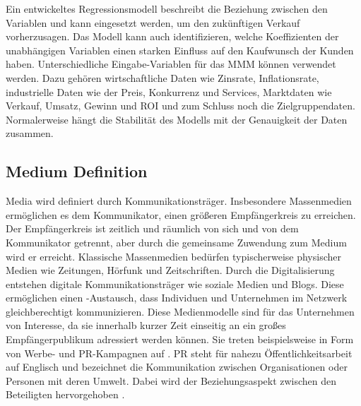 Ein entwickeltes Regressionsmodell beschreibt die Beziehung zwischen den Variablen und kann eingesetzt werden, um den zukünftigen Verkauf vorherzusagen. Das Modell kann auch identifizieren, welche Koeffizienten der unabhängigen Variablen einen starken Einfluss auf den Kaufwunsch der Kunden haben. Unterschiedliche Eingabe-Variablen für das \ac{MMM} können verwendet werden. Dazu gehören wirtschaftliche Daten wie Zinsrate, Inflationsrate, industrielle Daten wie der Preis, Konkurrenz und Services, Marktdaten wie Verkauf, Umsatz, Gewinn und \ac{ROI} und zum Schluss noch die Zielgruppendaten. Normalerweise hängt die Stabilität des Modells mit der Genauigkeit der Daten zusammen. 

\subsection{Medium Definition}
\label{Media-KanäleDefinition}
Media wird definiert durch Kommunikationsträger. Insbesondere Massenmedien ermöglichen es dem Kommunikator, einen größeren Empfängerkreis zu erreichen. Der Empfängerkreis ist zeitlich und räumlich von sich und von dem Kommunikator getrennt, aber durch die gemeinsame Zuwendung zum Medium wird er erreicht. Klassische Massenmedien bedürfen typischerweise physischer Medien wie Zeitungen, Hörfunk und Zeitschriften. Durch die Digitalisierung entstehen digitale Kommunikationsträger wie soziale Medien und Blogs. Diese ermöglichen einen -Austausch, dass Individuen und Unternehmen im Netzwerk gleichberechtigt kommunizieren. Diese Medienmodelle sind für das Unternehmen von Interesse, da sie innerhalb kurzer Zeit einseitig an ein großes Empfängerpublikum adressiert werden können. Sie treten beispielsweise in Form von Werbe- und \ac{PR}-Kampagnen auf \cite{Kleinjohann2024}. \ac{PR} steht für nahezu Öffentlichkeitsarbeit auf Englisch und bezeichnet die Kommunikation zwischen Organisationen oder Personen mit deren Umwelt. Dabei wird der Beziehungsaspekt zwischen den Beteiligten hervorgehoben \cite{Büsching2014}. \\\\
